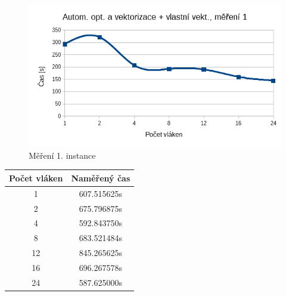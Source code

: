 \documentclass[12pt]{article}
\begin{document}
\begin{figure}[H]
  \begin{center}
     \includegraphics[width=12cm]{images/ssef1.png}
    \caption{Měření 1. instance} 
  \end{center}
\end{figure}
%
%
\begin{center}
\begin{tabular}{ c | c }
\textbf{Počet vláken} & \textbf{Naměřený čas} \\ \hline \hline 
1 & 607.515625s \\ \hline
2 & 675.796875s \\ \hline
4 & 592.843750s \\ \hline
8 & 683.521484s \\ \hline
12 & 845.265625s \\ \hline
16 & 696.267578s \\ \hline
24 & 587.625000s \\ \hline
\end{tabular}
\end{center}
\end{document}
